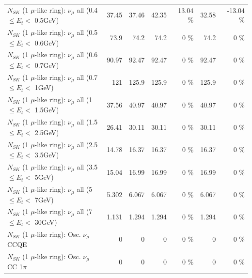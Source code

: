 \begin{table}
\begin{tabular}{| l | r | r | r  r | r  r |}
       $N_{SK}$ (1 $\mu$-like ring): $\nu_{\mu}$ all (0.4 $\leq E_{t} <$ 0.5GeV) &           37.45 &           37.46 &           42.35 &    13.04 \%  &           32.58 &   -13.04 \%  \\ 
       $N_{SK}$ (1 $\mu$-like ring): $\nu_{\mu}$ all (0.5 $\leq E_{t} <$ 0.6GeV) &            73.9 &            74.2 &            74.2 &        0 \%  &            74.2 &        0 \%  \\ 
       $N_{SK}$ (1 $\mu$-like ring): $\nu_{\mu}$ all (0.6 $\leq E_{t} <$ 0.7GeV) &           90.97 &           92.47 &           92.47 &        0 \%  &           92.47 &        0 \%  \\ 
         $N_{SK}$ (1 $\mu$-like ring): $\nu_{\mu}$ all (0.7 $\leq E_{t} <$ 1GeV) &             121 &           125.9 &           125.9 &        0 \%  &           125.9 &        0 \%  \\ 
         $N_{SK}$ (1 $\mu$-like ring): $\nu_{\mu}$ all (1 $\leq E_{t} <$ 1.5GeV) &           37.56 &           40.97 &           40.97 &        0 \%  &           40.97 &        0 \%  \\ 
       $N_{SK}$ (1 $\mu$-like ring): $\nu_{\mu}$ all (1.5 $\leq E_{t} <$ 2.5GeV) &           26.41 &           30.11 &           30.11 &        0 \%  &           30.11 &        0 \%  \\ 
       $N_{SK}$ (1 $\mu$-like ring): $\nu_{\mu}$ all (2.5 $\leq E_{t} <$ 3.5GeV) &           14.78 &           16.37 &           16.37 &        0 \%  &           16.37 &        0 \%  \\ 
         $N_{SK}$ (1 $\mu$-like ring): $\nu_{\mu}$ all (3.5 $\leq E_{t} <$ 5GeV) &           15.04 &           16.99 &           16.99 &        0 \%  &           16.99 &        0 \%  \\ 
           $N_{SK}$ (1 $\mu$-like ring): $\nu_{\mu}$ all (5 $\leq E_{t} <$ 7GeV) &           5.302 &           6.067 &           6.067 &        0 \%  &           6.067 &        0 \%  \\ 
          $N_{SK}$ (1 $\mu$-like ring): $\nu_{\mu}$ all (7 $\leq E_{t} <$ 30GeV) &           1.131 &           1.294 &           1.294 &        0 \%  &           1.294 &        0 \%  \\ 
\hline
\hline
                               $N_{SK}$ (1 $\mu$-like ring): Osc. $\nu_\mu$ CCQE &               0 &               0 &               0 &        0 \%  &               0 &        0 \%  \\ 
                          $N_{SK}$ (1 $\mu$-like ring): Osc. $\nu_\mu$ CC 1$\pi$ &               0 &               0 &               0 &        0 \%  &               0 &        0 \%  \\ 

\end{tabular}
\end{table}
